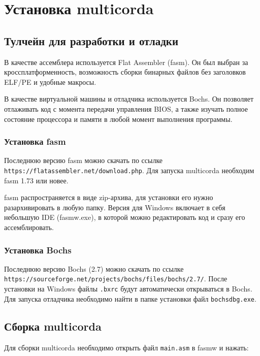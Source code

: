 \chapter{Установка multicorda}

\section{Тулчейн для разработки и отладки}

В качестве ассемблера используется Flat Assembler (fasm). Он был выбран за кроссплатформенность, возможность сборки бинарных файлов без заголовков ELF/PE и удобные макросы.

В качестве виртуальной машины и отладчика используется Bochs. Он позволяет отлаживать код с момента передачи управления BIOS, а также изучать полное состояние процессора и памяти в любой момент выполнения программы.

\subsection{Установка fasm}

Последнюю версию fasm можно скачать по ссылке\\ \verb|https://flatassembler.net/download.php|. Для запуска multicorda необходим fasm 1.73 или новее. 

fasm распространяется в виде zip-архива, для установки его нужно разархивировать в любую папку. Версия для Windows включает в себя небольшую IDE (fasmw.exe), в которой можно редактировать код и сразу его ассемблировать.

\subsection{Установка Bochs}

Последнюю версию Bochs (2.7) можно скачать по ссылке\\ \verb|https://sourceforge.net/projects/bochs/files/bochs/2.7/|. После установки на Windows файлы \verb|.bxrc| будут автоматически открываться в Bochs. Для запуска отладчика необходимо найти в папке установки файл \verb|bochsdbg.exe|. 

\section{Сборка multicorda}

Для сборки multicorda необходимо открыть файл \verb|main.asm| в fasmw и нажать:

